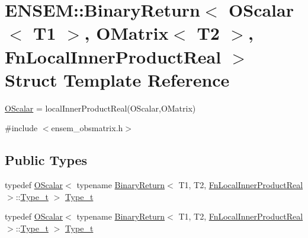 \hypertarget{structENSEM_1_1BinaryReturn_3_01OScalar_3_01T1_01_4_00_01OMatrix_3_01T2_01_4_00_01FnLocalInnerProductReal_01_4}{}\section{E\+N\+S\+EM\+:\+:Binary\+Return$<$ O\+Scalar$<$ T1 $>$, O\+Matrix$<$ T2 $>$, Fn\+Local\+Inner\+Product\+Real $>$ Struct Template Reference}
\label{structENSEM_1_1BinaryReturn_3_01OScalar_3_01T1_01_4_00_01OMatrix_3_01T2_01_4_00_01FnLocalInnerProductReal_01_4}


\mbox{\hyperlink{classENSEM_1_1OScalar}{O\+Scalar}} = local\+Inner\+Product\+Real(\+O\+Scalar,\+O\+Matrix)  




{\ttfamily \#include $<$ensem\+\_\+obsmatrix.\+h$>$}

\subsection*{Public Types}
\begin{DoxyCompactItemize}
\item 
typedef \mbox{\hyperlink{classENSEM_1_1OScalar}{O\+Scalar}}$<$ typename \mbox{\hyperlink{structENSEM_1_1BinaryReturn}{Binary\+Return}}$<$ T1, T2, \mbox{\hyperlink{structENSEM_1_1FnLocalInnerProductReal}{Fn\+Local\+Inner\+Product\+Real}} $>$\+::\mbox{\hyperlink{structENSEM_1_1BinaryReturn_3_01OScalar_3_01T1_01_4_00_01OMatrix_3_01T2_01_4_00_01FnLocalInnerProductReal_01_4_a7979f0e65a026ed5c70cf4ad2aab4ebe}{Type\+\_\+t}} $>$ \mbox{\hyperlink{structENSEM_1_1BinaryReturn_3_01OScalar_3_01T1_01_4_00_01OMatrix_3_01T2_01_4_00_01FnLocalInnerProductReal_01_4_a7979f0e65a026ed5c70cf4ad2aab4ebe}{Type\+\_\+t}}
\item 
typedef \mbox{\hyperlink{classENSEM_1_1OScalar}{O\+Scalar}}$<$ typename \mbox{\hyperlink{structENSEM_1_1BinaryReturn}{Binary\+Return}}$<$ T1, T2, \mbox{\hyperlink{structENSEM_1_1FnLocalInnerProductReal}{Fn\+Local\+Inner\+Product\+Real}} $>$\+::\mbox{\hyperlink{structENSEM_1_1BinaryReturn_3_01OScalar_3_01T1_01_4_00_01OMatrix_3_01T2_01_4_00_01FnLocalInnerProductReal_01_4_a7979f0e65a026ed5c70cf4ad2aab4ebe}{Type\+\_\+t}} $>$ \mbox{\hyperlink{structENSEM_1_1BinaryReturn_3_01OScalar_3_01T1_01_4_00_01OMatrix_3_01T2_01_4_00_01FnLocalInnerProductReal_01_4_a7979f0e65a026ed5c70cf4ad2aab4ebe}{Type\+\_\+t}}
\end{DoxyCompactItemize}


